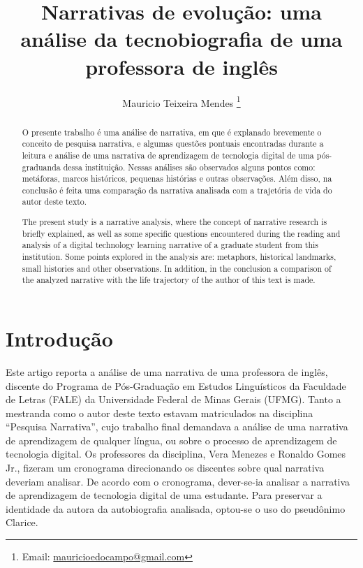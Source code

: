 \documentclass{textolivre}
\title{Narrativas de evolução: uma análise da tecnobiografia de uma professora de inglês}
\author[1]{Mauricio Teixeira Mendes \orcid{0000-0001-9619-5903} \thanks{Email: \url{mauricioedocampo@gmail.com}}}
\affil[1]{Universidade Federal de Minas Gerais, Brasil.}
\begin{document}
\maketitle

\begin{polyabstract}
\begin{portuguese}
\begin{abstract}
O presente trabalho é uma análise de narrativa, em que é explanado brevemente o conceito de pesquisa narrativa, e algumas questões pontuais encontradas durante a leitura e análise de uma narrativa de aprendizagem de tecnologia digital de uma pós-graduanda dessa instituição. Nessas análises são observados alguns pontos como: metáforas, marcos históricos, pequenas histórias e outras observações. Além disso, na conclusão é feita uma comparação da narrativa analisada com a trajetória de vida do autor deste texto.

\end{abstract}
\end{portuguese}

\begin{english}
\begin{abstract}
The present study is a narrative analysis, where the concept of narrative research is briefly explained, as well as some specific questions encountered during the reading and analysis of a digital technology learning narrative of a graduate student from this institution. Some points explored in the analysis are: metaphors, historical landmarks, small histories and other observations. In addition, in the conclusion a comparison of the analyzed narrative with the life trajectory of the author of this text is made.

\end{abstract}
\end{english}

\end{polyabstract}


\section{Introdução}\label{sec-intro}
Este artigo reporta a análise de uma narrativa de uma professora de inglês, discente do Programa de Pós-Graduação em Estudos Linguísticos da Faculdade de Letras (FALE) da Universidade Federal de Minas Gerais (UFMG). Tanto a mestranda como o autor deste texto estavam matriculados na disciplina “Pesquisa Narrativa”, cujo trabalho final demandava a análise de uma narrativa de aprendizagem de qualquer língua, ou sobre o processo de aprendizagem de tecnologia digital. Os professores da disciplina, Vera Menezes e Ronaldo Gomes Jr., fizeram um cronograma direcionando os discentes sobre qual narrativa deveriam analisar. De acordo com o cronograma, dever-se-ia analisar a narrativa de aprendizagem de tecnologia digital de uma estudante. Para preservar a identidade da autora da autobiografia analisada, optou-se o uso do pseudônimo Clarice.
\end{document}
